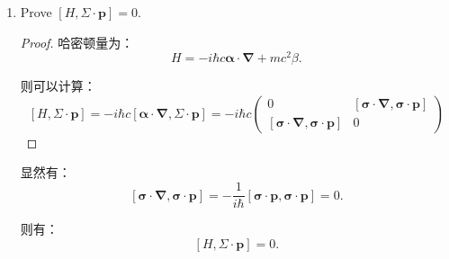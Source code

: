 \documentclass[reqno,a4paper,12pt]{amsart}
\begin{document}
\begin{enumerate}[1.]
\begin{proof}
其中，由于
\[
	\left[\frac{\partial}{\partial t}, \sum_{k=1}^3 \alpha^k \frac{\partial }{\partial x_k} + i\frac{mc}{\hbar}\beta \right] = 0.
\]

后两项和等于0。

利用
\[
	\{\alpha_i, \alpha_j\} = 2\delta_{ij}, \ \ \{\alpha_i, \beta\} = 0, \ \ \beta^2 = \mathbf{I}.
\]

可以进一步计算得到：
\begin{align*}
	&\left( \frac{1}{c}\frac{\partial }{\partial t} - \sum_{l=1}^3 \alpha^l \frac{\partial }{\partial x_l} - i\frac{mc}{\hbar}\beta \right) \left( \frac{1}{c}\frac{\partial }{\partial t} + \sum_{k=1}^3 \alpha^k \frac{\partial }{\partial x_k} + i\frac{mc}{\hbar}\beta \right) \\
	=& \frac{1}{c^2} \frac{\partial^2}{\partial t^2} - \left( \sum_{k=1}^3 \alpha^k \frac{\partial }{\partial x_k} + i\frac{mc}{\hbar}\beta \right)^2 \\
	=& \frac{1}{c^2} \frac{\partial^2}{\partial t^2} - \nabla^2 + \frac{m^2c^2}{\hbar^2}.
\end{align*}

即有：
\[
	\left( \frac{1}{c^2} \frac{\partial^2}{\partial t^2} - \nabla^2 + \frac{m^2c^2}{\hbar^2} \right) \psi = 0.
\]

即得到了Klein-Gordon方程。

\end{proof}

\medskip

\item Prove $[H, \boldsymbol{\varSigma} \cdot \boldsymbol{p}] = 0$.

\begin{proof}
哈密顿量为：
\[
	H = -i\hbar c \boldsymbol{\alpha \cdot \nabla} + mc^2\beta.
\]

则可以计算：
\[
	[H, \boldsymbol{\varSigma \cdot p}] = -i\hbar c [\boldsymbol{\alpha \cdot \nabla}, \boldsymbol{\varSigma \cdot p}] = -i\hbar c \left( \begin{matrix}
		0 & [\boldsymbol{\sigma \cdot \nabla}, \boldsymbol{\sigma \cdot p}] \\
		[\boldsymbol{\sigma \cdot \nabla}, \boldsymbol{\sigma \cdot p}] & 0
	\end{matrix} \right)
\]
\end{proof}

显然有：
\[
	[\boldsymbol{\sigma \cdot \nabla}, \boldsymbol{\sigma \cdot p}] = -\frac{1}{i\hbar} [\boldsymbol{\sigma \cdot p}, \boldsymbol{\sigma \cdot p}] = 0.
\]

则有：
\[
	[H, \boldsymbol{\varSigma \cdot p}] = 0.
\]

\end{enumerate}
\end{document}
